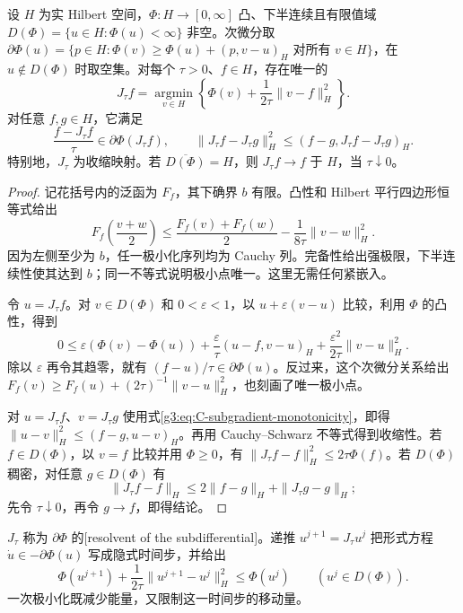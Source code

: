 \begin{theorem}\label{g3:thm:C-resolvent}
	设 \(H\) 为实 Hilbert 空间，\(\Phi:H\to[0,\infty]\) 凸、下半连续且有限值域 \(D(\Phi)=\{u\in H:\Phi(u)<\infty\}\) 非空。次微分取 \(\partial\Phi(u)=\{p\in H:\Phi(v)\ge\Phi(u)+(p,v-u)_H\text{ 对所有 }v\in H\}\)，在 \(u\notin D(\Phi)\) 时取空集。对每个 \(\tau>0\)、\(f\in H\)，存在唯一的
	\[
		J_\tau f=\underset{v\in H}{\operatorname{argmin}}
							\left\{\Phi(v)+\frac1{2\tau}\|v-f\|_H^2\right\}.
	\]
	对任意 \(f,g\in H\)，它满足
	\[
		\frac{f-J_\tau f}{\tau}\in\partial\Phi(J_\tau f),
		\qquad
		\|J_\tau f-J_\tau g\|_H^2
		\le(f-g,J_\tau f-J_\tau g)_H.
	\]
	特别地，\(J_\tau\) 为收缩映射。若 \(\overline{D(\Phi)}=H\)，则 \(J_\tau f\to f\) 于 \(H\)，当 \(\tau\downarrow0\)。
\end{theorem}
\begin{proof}
	记花括号内的泛函为 \(F_f\)，其下确界 \(b\) 有限。凸性和 Hilbert 平行四边形恒等式给出
	\[
		F_f\left(\frac{v+w}{2}\right)
		\le\frac{F_f(v)+F_f(w)}2-\frac1{8\tau}\|v-w\|_H^2.
	\]
	因为左侧至少为 \(b\)，任一极小化序列均为 Cauchy 列。完备性给出强极限，下半连续性使其达到 \(b\)；同一不等式说明极小点唯一。这里无需任何紧嵌入。

	令 \(u=J_\tau f\)。对 \(v\in D(\Phi)\) 和 \(0<\varepsilon<1\)，以 \(u+\varepsilon(v-u)\) 比较，利用 \(\Phi\) 的凸性，得到
	\[
	0\le\varepsilon(\Phi(v)-\Phi(u))
							+\frac\varepsilon\tau(u-f,v-u)_H
							+\frac{\varepsilon^2}{2\tau}\|v-u\|_H^2.
	\]
	除以 \(\varepsilon\) 再令其趋零，就有 \((f-u)/\tau\in\partial\Phi(u)\)。反过来，这个次微分关系给出
	\(F_f(v)\ge F_f(u)+(2\tau)^{-1}\|v-u\|_H^2\)，也刻画了唯一极小点。

	对 \(u=J_\tau f\)、\(v=J_\tau g\) 使用式\eqref{g3:eq:C-subgradient-monotonicity}，即得
	\(\|u-v\|_H^2\le(f-g,u-v)_H\)。再用 Cauchy--Schwarz 不等式得到收缩性。若 \(f\in D(\Phi)\)，以 \(v=f\) 比较并用 \(\Phi\ge0\)，有
	\(\|J_\tau f-f\|_H^2\le2\tau\Phi(f)\)。若 \(D(\Phi)\) 稠密，对任意 \(g\in D(\Phi)\) 有
	\[
		\|J_\tau f-f\|_H
		\le2\|f-g\|_H+\|J_\tau g-g\|_H;
	\]
	先令 \(\tau\downarrow0\)，再令 \(g\to f\)，即得结论。
\end{proof}

\(J_\tau\) 称为 \(\partial\Phi\) 的[resolvent of the subdifferential]。递推 \(u^{j+1}=J_\tau u^j\) 把形式方程 \(\dot u\in-\partial\Phi(u)\) 写成隐式时间步，并给出
\[
	\Phi(u^{j+1})+\frac1{2\tau}\|u^{j+1}-u^j\|_H^2\le\Phi(u^j)
	\qquad(u^j\in D(\Phi)).
\]
一次极小化既减少能量，又限制这一时间步的移动量。


